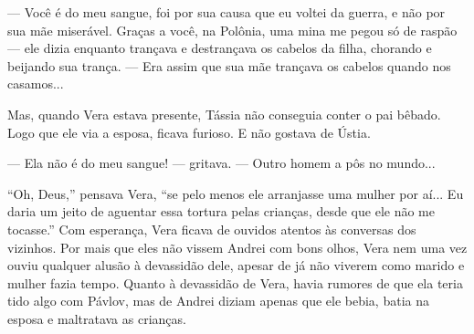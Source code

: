 --- Você é do meu sangue, foi por sua causa que eu voltei da guerra, e
não por sua mãe miserável. Graças a você, na Polônia, uma mina me pegou
só de raspão --- ele dizia enquanto trançava e destrançava os cabelos da
filha, chorando e beijando sua trança. --- Era assim que sua mãe
trançava os cabelos quando nos casamos...

Mas, quando Vera estava presente, Tássia não conseguia conter o pai
bêbado. Logo que ele via a esposa, ficava furioso. E não gostava de
Ústia.

--- Ela não é do meu sangue! --- gritava. --- Outro homem a pôs no
mundo...

``Oh, Deus,'' pensava Vera, ``se pelo menos ele arranjasse uma mulher
por aí... Eu daria um jeito de aguentar essa tortura pelas crianças,
desde que ele não me tocasse.'' Com esperança, Vera ficava de ouvidos
atentos às conversas dos vizinhos. Por mais que eles não vissem Andrei
com bons olhos, Vera nem uma vez ouviu qualquer alusão à devassidão
dele, apesar de já não viverem como marido e mulher fazia tempo. Quanto
à devassidão de Vera, havia rumores de que ela teria tido algo com
Pávlov, mas de Andrei diziam apenas que ele bebia, batia na esposa e
maltratava as crianças.

